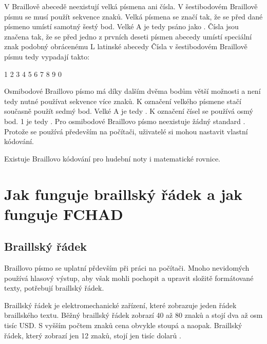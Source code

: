 V Braillově abecedě neexistují velká písmena ani čísla. V šestibodovém Braillově písmu se musí použít sekvence znaků. Velká písmena se značí tak, že se před dané písmeno umístí samotný šestý bod. Velké A je tedy psáno jako
. Čísla jsou značena tak, že se před jedno z prvních deseti písmen abecedy umístí speciální znak podobný obrácenému L latinské abecedy
Čísla v šestibodovém Braillově písmu tedy vypadají takto:

1
2
3
4
5
6
7
8
9
0

Osmibodové Braillovo písmo má díky dalším dvěma bodům větší možnosti a není tedy nutné používat sekvence více znaků. K označení velkého písmene stačí současně použít sedmý bod. Velké A je tedy
. K označení čísel se používá osmý bod. 1 je tedy
. Pro osmibodové Braillovo písmo neexistuje žádný standard \citep{6dotbraille}.  Protože se používá především na počítači, uživatelé si mohou nastavit vlastní kódování.

Existuje Braillovo kódování pro hudební noty i matematické rovnice.

\section{Jak funguje braillský řádek a jak funguje FCHAD}

\subsection{Braillský řádek}

Braillovo písmo se uplatní přdevším při práci na počítači.  Mnoho nevidomých používá hlasový výstup, aby však mohli pochopit a upravit složitě formátované texty, potřebují braillský řádek.

Braillský řádek je elektromechanické zařízení, které zobrazuje jeden řádek braillského textu.  Běžný braillský řádek zobrazí 40 až 80 znaků a stojí dva až osm tisíc USD.  S vyšším počtem znaků cena obvykle stoupá a naopak.  Braillský řádek, který zobrazí jen 12 znaků, stojí jen tisíc dolarů \citep{perkinsdisplays}.

